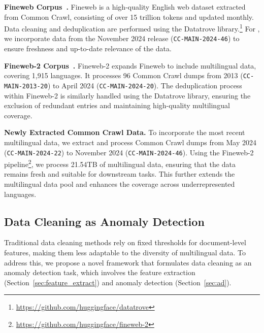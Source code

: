 \textbf{Fineweb Corpus~\cite{penedo2024fineweb}.}
Fineweb is a high-quality English web dataset extracted from Common Crawl, consisting of over 15 trillion tokens and updated monthly.
Data cleaning and deduplication are performed using the Datatrove library.\footnote{\url{https://github.com/huggingface/datatrove}}
For \dcad, we incorporate data from the November 2024 release (\texttt{CC-MAIN-2024-46}) to ensure freshness and up-to-date relevance of the data.

\textbf{Fineweb-2 Corpus~\cite{penedo2024fineweb-2}.}
Fineweb-2 expands Fineweb to include multilingual data, covering 1,915 languages.
It processes 96 Common Crawl dumps from 2013 (\texttt{CC-MAIN-2013-20}) to April 2024 (\texttt{CC-MAIN-2024-20}). 
The deduplication process within Fineweb-2 is similarly handled using the Datatrove library, ensuring the exclusion of redundant entries and maintaining high-quality multilingual coverage.

\textbf{Newly Extracted Common Crawl Data.}
To incorporate the most recent multilingual data, we extract and process Common Crawl dumps from May 2024 (\texttt{CC-MAIN-2024-22}) to November 2024 (\texttt{CC-MAIN-2024-46}).
Using the Fineweb-2 pipeline\footnote{\url{https://github.com/huggingface/fineweb-2}}, we process 21.54TB of multilingual data, ensuring that the data remains fresh and suitable for downstream tasks.
This further extends the multilingual data pool and enhances the coverage across underrepresented languages.



\subsection{Data Cleaning as Anomaly Detection}
\label{sec:ad_clean}
Traditional data cleaning methods rely on fixed thresholds for document-level features, making them less adaptable to the diversity of multilingual data.
To address this, we propose a novel framework that formulates data cleaning as an anomaly detection task, which involves the feature extraction (Section~\ref{sec:feature_extract}) and anomaly detection (Section~\ref{sec:ad}).

